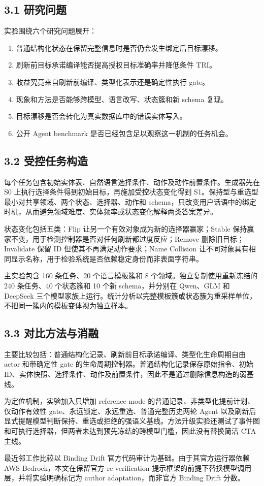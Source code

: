 \documentclass[10.5pt,fontset=none]{ctexart}
\begin{document}
\subsection{3.1 研究问题}
\par 实验围绕六个研究问题展开：
\begin{enumerate}
\item 普通结构化状态在保留完整信息时是否仍会发生绑定后目标漂移。
\item 刷新前目标承诺编译能否提高授权目标准确率并降低条件 TRI。
\item 收益究竟来自刷新前编译、类型化表示还是确定性执行 gate。
\item 现象和方法是否能够跨模型、语言改写、状态簇和新 schema 复现。
\item 目标漂移是否会转化为真实数据库中的错误实体写入。
\item 公开 Agent benchmark 是否已经包含足以观察这一机制的任务机会。
\end{enumerate}
\subsection{3.2 受控任务构造}
\par 每个任务包含初始实体表、自然语言选择条件、动作及动作前置条件。生成器先在 S0 上执行选择条件得到初始目标，再施加受控状态变化得到 S1。保持型与重选型最小对共享领域、两个状态、选择器、动作和 schema，只改变用户话语中的绑定时机，从而避免领域难度、实体频率或状态变化解释两类答案差异。
\par 状态变化包括五类：Flip 让另一个有效对象成为新的选择器赢家；Stable 保持赢家不变，用于检测控制器是否对任何刷新都过度反应；Remove 删除旧目标；Invalidate 保留 ID 但使其不再满足动作要求；Name Collision 让不同对象具有相同显示名称，用于检验系统是否依赖稳定身份而非表面字符串。
\par 主实验包含 160 条任务、20 个语言模板簇和 8 个领域。独立复制使用重新冻结的 240 条任务、40 个状态簇和 10 个新 schema，并分别在 Qwen、GLM 和 DeepSeek 三个模型家族上运行。统计分析以完整模板簇或状态簇为重采样单位，不把同一簇内的模板变体视为独立样本。
\subsection{3.3 对比方法与消融}
\par 主要比较包括：普通结构化记录、刷新前目标承诺编译、类型化生命周期自由 actor 和带确定性 gate 的生命周期控制器。普通结构化记录保存原始指令、初始 ID、实体快照、选择条件、动作及前置条件，因此不是通过删除信息构造的弱基线。
\par 为定位机制，实验加入只增加 reference mode 的普通记录、非类型化提前计划、仅动作有效性 gate、永远锁定、永远重选、普通完整历史两轮 Agent 以及刷新后显式提醒模型判断保持、重选或拒绝的强语义基线。方法升级实验还测试了事件图和可执行选择器，但两者未达到预先冻结的跨模型门槛，因此没有替换简洁 CTA 主线。
\par 最近邻工作比较以 Binding Drift 官方代码审计为基础。由于其官方运行器依赖 AWS Bedrock，本文在保留官方 re-verification 提示框架的前提下替换模型调用层，并将实验明确标记为 author adaptation，而非官方 Binding Drift 分数。
\end{document}
